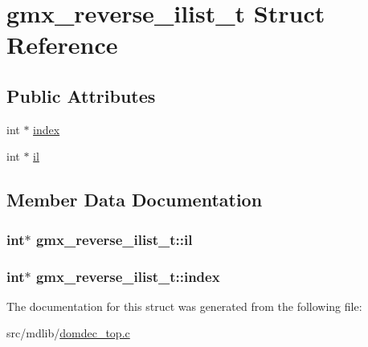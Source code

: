 \hypertarget{structgmx__reverse__ilist__t}{\section{gmx\-\_\-reverse\-\_\-ilist\-\_\-t \-Struct \-Reference}
\label{structgmx__reverse__ilist__t}
}
\subsection*{\-Public \-Attributes}
\begin{DoxyCompactItemize}
\item 
int $\ast$ \hyperlink{structgmx__reverse__ilist__t_ab6a429c639ad47805ddf9f643f0768d7}{index}
\item 
int $\ast$ \hyperlink{structgmx__reverse__ilist__t_a3c752ff15a202db1924295ad693d154e}{il}
\end{DoxyCompactItemize}


\subsection{\-Member \-Data \-Documentation}
\hypertarget{structgmx__reverse__ilist__t_a3c752ff15a202db1924295ad693d154e}{
\subsubsection[{il}]{\setlength{\rightskip}{0pt plus 5cm}int$\ast$ {\bf gmx\-\_\-reverse\-\_\-ilist\-\_\-t\-::il}}}\label{structgmx__reverse__ilist__t_a3c752ff15a202db1924295ad693d154e}
\hypertarget{structgmx__reverse__ilist__t_ab6a429c639ad47805ddf9f643f0768d7}{
\subsubsection[{index}]{\setlength{\rightskip}{0pt plus 5cm}int$\ast$ {\bf gmx\-\_\-reverse\-\_\-ilist\-\_\-t\-::index}}}\label{structgmx__reverse__ilist__t_ab6a429c639ad47805ddf9f643f0768d7}


\-The documentation for this struct was generated from the following file\-:\begin{DoxyCompactItemize}
\item 
src/mdlib/\hyperlink{domdec__top_8c}{domdec\-\_\-top.\-c}\end{DoxyCompactItemize}
